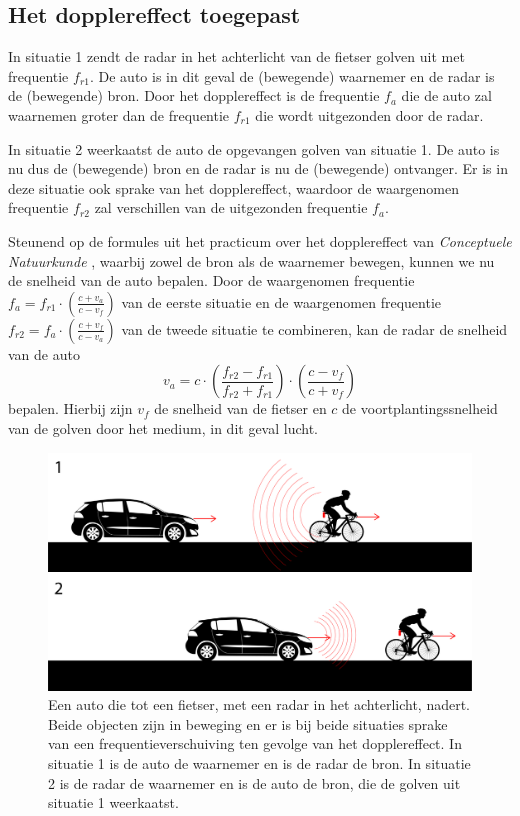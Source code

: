 \documentclass[kulak]{kulakarticle} %
\begin{document}
\subsection{Het dopplereffect toegepast}

In situatie 1 zendt de radar in het achterlicht van de fietser golven uit met frequentie \(f_{r1}\). De auto is in dit geval de (bewegende) waarnemer en de radar is de (bewegende) bron. Door het dopplereffect is de frequentie \(f_a\) die de auto zal waarnemen groter dan de frequentie \(f_{r1}\) die wordt uitgezonden door de radar.

In situatie 2 weerkaatst de auto de opgevangen golven van situatie 1. De auto is nu dus de (bewegende) bron en de radar is nu de (bewegende) ontvanger. Er is in deze situatie ook sprake van het dopplereffect, waardoor de waargenomen frequentie \(f_{r2}\) zal verschillen van de uitgezonden frequentie \(f_a\).

Steunend op de formules uit het practicum over het dopplereffect van \textit{Conceptuele Natuurkunde}  \cite{practicumdoppler}, waarbij zowel de bron als de waarnemer bewegen, kunnen we nu de snelheid van de auto bepalen. Door de waargenomen frequentie \( f_a=f_{r1}\cdot \left( \frac{c+v_a}{c-v_f} \right) \) van de eerste situatie en de waargenomen frequentie \( f_{r2}=f_a\cdot \left( \frac{c+v_f}{c-v_a} \right) \) van de tweede situatie te combineren, kan de radar de snelheid van de auto \[v_a = c \cdot \left( \frac{f_{r2}-f_{r1}}{f_{r2}+f_{r1}} \right)\cdot \left(\frac{c-v_f}{c+v_f} \right)\] bepalen. Hierbij zijn \(v_f\) de snelheid van de fietser en \(c\) de voortplantingssnelheid van de golven door het medium, in dit geval lucht.

\newpage

\begin{figure}
	\centering
	\includegraphics[width=.7\textwidth]{doppler.jpg}
	\caption{Een auto die tot een fietser, met een radar in het achterlicht, nadert. Beide objecten zijn in beweging en er is bij beide situaties sprake van een frequentieverschuiving ten gevolge van het dopplereffect. In situatie 1 is de auto de waarnemer en is de radar de bron. In situatie 2 is de radar de waarnemer en is de auto de bron, die de golven uit situatie 1 weerkaatst.}
	\label{fig:doppler}
\end{figure}
\end{document}
